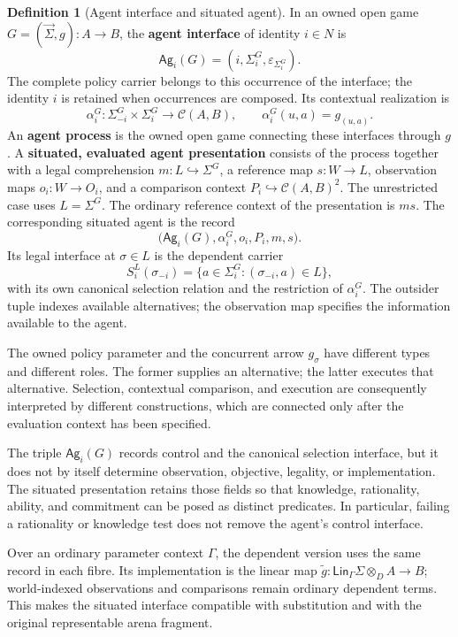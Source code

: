 \documentclass[11pt,a4paper]{article}
\numberwithin{equation}{section}
\theoremstyle{definition}
\newtheorem{definition}[theorem]{Definition}
\theoremstyle{remark}
\theoremstyle{plain}
\begin{document}
\begin{definition}[Agent interface and situated agent]
\label{def:egt-agent-interface}
In an owned open game $G=(\vec\Sigma,g):A\to B$, the
\textbf{agent interface} of identity $i\in N$ is
\[
 \mathsf{Ag}_i(G)=(i,\Sigma_i^G,\varepsilon_{\Sigma_i^G}).
\]
The complete policy carrier belongs to this occurrence of the interface;
the identity $i$ is retained when occurrences are composed. Its contextual
realization is
\[
 \alpha_i^G:\Sigma_{-i}^G\times\Sigma_i^G\longrightarrow\mathcal C(A,B),
 \qquad \alpha_i^G(u,a)=g_{(u,a)}.
\]
An \textbf{agent process} is the owned open game connecting these interfaces
through $g$. A \textbf{situated, evaluated agent presentation} consists of
the process together with a legal comprehension $m:L\hookrightarrow\Sigma^G$,
a reference map $s:W\to L$, observation maps $o_i:W\to O_i$, and a comparison
context $P_i\hookrightarrow\mathcal C(A,B)^2$. The unrestricted case uses
$L=\Sigma^G$. The ordinary reference context of the presentation is $ms$.
The corresponding situated agent is the record
\[
 \bigl(\mathsf{Ag}_i(G),\alpha_i^G,o_i,P_i,m,s\bigr).
\]
Its legal interface at $\sigma\in L$ is the dependent carrier
\[
 S_i^L(\sigma_{-i})
 =\{a\in\Sigma_i^G:(\sigma_{-i},a)\in L\},
\]
with its own canonical selection relation and the restriction of
$\alpha_i^G$. The outsider tuple indexes available alternatives; the
observation map specifies the information available to the agent.
\end{definition}

The owned policy parameter and the concurrent arrow $g_\sigma$ have
different types and different roles. The former supplies an alternative;
the latter executes that alternative. Selection, contextual comparison,
and execution are consequently interpreted by different constructions,
which are connected only after the evaluation context has been specified.

The triple $\mathsf{Ag}_i(G)$ records control and the canonical
selection interface, but it does not by itself determine observation,
objective, legality, or implementation. The situated presentation retains
those fields so that knowledge, rationality, ability, and commitment can be
posed as distinct predicates. In particular, failing a rationality or
knowledge test does not remove the agent's control interface.

Over an ordinary parameter context $\Gamma$, the dependent version
uses the same record in each fibre.
Its implementation is the linear map
$\widetilde g:\mathsf{Lin}_\Gamma\Sigma\otimes_D A\to B$;
world-indexed observations and comparisons remain ordinary dependent
terms. This makes the situated interface compatible with substitution and
with the original representable arena fragment.
\end{document}
